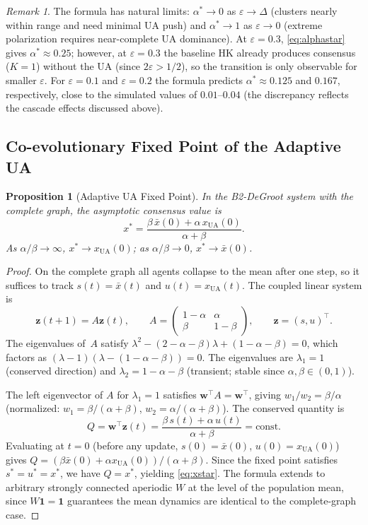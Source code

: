 \documentclass{article}
\theoremstyle{plain}
\newtheorem{proposition}[theorem]{Proposition}
\theoremstyle{definition}
\theoremstyle{remark}
\newtheorem{remark}[theorem]{Remark}
\newcommand{\bw}{\mathbf{w}}
\newcommand{\bz}{\mathbf{z}}
\newcommand{\bone}{\mathbf{1}}
\newcommand{\xUA}{x_{\mathrm{UA}}}
\newcommand{\xbar}{\bar{x}}
\begin{document}
\begin{remark}
The formula has natural limits: $\alpha^*\to 0$ as $\varepsilon\to\Delta$
(clusters nearly within range and need minimal UA push) and
$\alpha^*\to 1$ as $\varepsilon\to 0$ (extreme polarization requires
near-complete UA dominance).  At $\varepsilon=0.3$, \eqref{eq:alphastar}
gives $\alpha^*\approx 0.25$; however, at $\varepsilon=0.3$ the baseline HK
already produces consensus ($K=1$) without the UA (since $2\varepsilon>1/2$),
so the transition is only observable for smaller $\varepsilon$.
For $\varepsilon=0.1$ and $\varepsilon=0.2$ the formula predicts
$\alpha^*\approx 0.125$ and $0.167$, respectively, close to the simulated
values of $0.01$--$0.04$ (the discrepancy reflects the cascade effects
discussed above).
\end{remark}

\subsection{Co-evolutionary Fixed Point of the Adaptive UA}

\begin{proposition}[Adaptive UA Fixed Point]
\label{prop:adaptive}
In the B2-DeGroot system with the complete graph, the asymptotic consensus
value is
\begin{equation}
    x^* = \frac{\beta\,\xbar(0) + \alpha\,\xUA(0)}{\alpha+\beta}.
    \label{eq:xstar}
\end{equation}
As $\alpha/\beta\to\infty$, $x^*\to\xUA(0)$; as $\alpha/\beta\to 0$,
$x^*\to\xbar(0)$.
\end{proposition}

\begin{proof}
On the complete graph all agents collapse to the mean after one step, so
it suffices to track $s(t)=\xbar(t)$ and $u(t)=\xUA(t)$.
The coupled linear system is
\[
    \bz(t+1) = A\bz(t), \qquad
    A = \begin{pmatrix} 1-\alpha & \alpha \\ \beta & 1-\beta \end{pmatrix},
    \qquad \bz=(s,u)^\top.
\]
The eigenvalues of~$A$ satisfy
$\lambda^2-(2-\alpha-\beta)\lambda+(1-\alpha-\beta)=0$,
which factors as $(\lambda-1)(\lambda-(1-\alpha-\beta))=0$.
The eigenvalues are $\lambda_1=1$ (conserved direction) and
$\lambda_2=1-\alpha-\beta$ (transient; stable since $\alpha,\beta\in(0,1)$).

The left eigenvector of $A$ for $\lambda_1=1$ satisfies $\bw^\top A=\bw^\top$,
giving $w_1/w_2=\beta/\alpha$ (normalized: $w_1=\beta/(\alpha+\beta)$,
$w_2=\alpha/(\alpha+\beta)$).  The conserved quantity is
\[
    Q = \bw^\top\bz(t) = \frac{\beta\,s(t)+\alpha\,u(t)}{\alpha+\beta} = \text{const}.
\]
Evaluating at $t=0$ (before any update, $s(0)=\xbar(0)$, $u(0)=\xUA(0)$)
gives $Q=(\beta\xbar(0)+\alpha\xUA(0))/(\alpha+\beta)$.
Since the fixed point satisfies $s^*=u^*=x^*$, we have $Q=x^*$, yielding
\eqref{eq:xstar}.
The formula extends to arbitrary strongly connected aperiodic $W$ at the
level of the population mean, since $W\bone=\bone$ guarantees the mean
dynamics are identical to the complete-graph case.
\end{proof}
\end{document}
